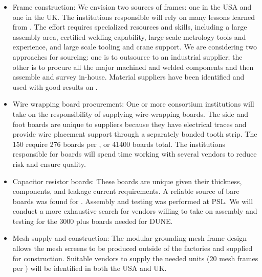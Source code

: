 \begin{itemize}

\item Frame construction: We envision two sources of frames: one in the USA and one in the UK. The institutions responsible will rely on many lessons learned from . The effort requires specialized resources and skills, including a large assembly area, certified welding capability, large scale metrology tools and experience, and large scale tooling and crane support. We are considering two approaches for sourcing: one is to outsource to an industrial supplier; the other is to procure all the major machined and welded components and then assemble and survey in-house. Material suppliers have been identified and used with good results on .

\item Wire wrapping board procurement: One or more consortium institutions will take on the responsibility of supplying wire-wrapping boards. The side and foot boards are unique to suppliers because they have electrical traces and provide wire placement support through a separately bonded tooth strip. The \num{150}  require \num{276} boards per , or \num{41400} boards total. The institutions responsible for boards will spend time working with several vendors to reduce risk and ensure quality. 

\item Capacitor resistor boards: These boards are unique given their thickness, 
 components, and leakage current requirements. A reliable source of bare boards was found for . Assembly and testing was performed at PSL. We will conduct a more exhaustive search for vendors willing to take on assembly and testing for the \num{3000} plus boards needed for DUNE.

\item Mesh supply and construction: The modular grounding mesh frame design allows the mesh screens to be produced outside of the factories and supplied for  construction.  Suitable vendors to supply the needed units (20 mesh frames per ) will be identified in both the USA and UK.   %


\end{itemize}
